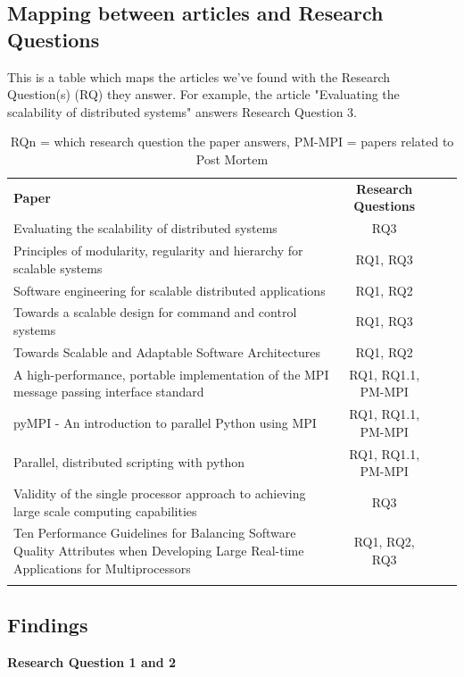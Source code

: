 \documentclass{article}
\begin{document}
\subsection{Mapping between articles and Research Questions}
This is a table which maps the articles we've found with the Research
Question(s) (RQ) they answer.  For example, the article "Evaluating the
scalability of distributed systems" answers Research Question 3.  

\begin{table}[H]
\begin{tabular}{p{8cm} c c r}
  \rowcolor[gray]{0.5}
  {\bf Paper} & {\bf Research Questions} \\
  Evaluating the scalability of distributed systems & RQ3 \\
  Principles of modularity, regularity and hierarchy for scalable systems & RQ1, RQ3 \\
  Software engineering for scalable distributed applications & RQ1, RQ2 \\
  Towards a scalable design for command and control systems & RQ1, RQ3 \\
  Towards Scalable and Adaptable Software Architectures & RQ1, RQ2 \\
  A high-performance, portable implementation of the MPI message passing interface standard & RQ1, RQ1.1, PM-MPI \\
  pyMPI - An introduction to parallel Python using MPI & RQ1, RQ1.1, PM-MPI \\
  Parallel, distributed scripting with python & RQ1, RQ1.1, PM-MPI \\
  Validity of the single processor approach to achieving large scale computing capabilities & RQ3 \\
  Ten Performance Guidelines for Balancing Software Quality Attributes when Developing Large Real-time Applications for Multiprocessors & RQ1, RQ2, RQ3 \\
  
\rowcolor[gray]{0.5}
\end{tabular}
\caption{RQ{n} = which research question the paper answers,
 PM-MPI = papers related to Post Mortem }
\end{table}

\subsection{Findings}

\textbf{Research Question 1 and 2}
\end{document}
